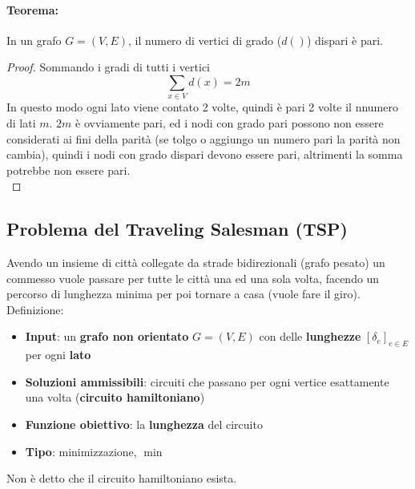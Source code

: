 \documentclass[11pt]{article}
\begin{document}
	\paragraph{Teorema:} In un grafo $G=(V,E)$, il numero di vertici di grado ($d()$) dispari è pari.\\
	
	\begin{proof}
		Sommando i gradi di tutti i vertici
		$$ \sum_{x \in V} d(x) = 2m $$
		In questo modo ogni lato viene contato 2 volte, quindi è pari 2 volte il nnumero di lati $m$. $2m$ è ovviamente pari, ed i nodi con grado pari possono non essere considerati ai fini della parità (se tolgo o aggiungo un numero pari la parità non cambia), quindi i nodi con grado dispari devono essere pari, altrimenti la somma potrebbe non essere pari.\\
	\end{proof}
	
	
	\newpage
	
	\subsection{Problema del Traveling Salesman (TSP)}
	Avendo un insieme di città collegate da strade bidirezionali (grafo pesato) un commesso vuole passare per tutte le città una ed una sola volta, facendo un percorso di lunghezza minima per poi tornare a casa (vuole fare il giro).\\
	
	Definizione: 
	\begin{itemize}
		\item \textbf{Input}: un \textbf{grafo non orientato} $G = (V,E)$ con delle \textbf{lunghezze} $[\delta_e]_{e \in E}$ per ogni \textbf{lato}
		
		\item \textbf{Soluzioni ammissibili}: circuiti che passano per ogni vertice esattamente una volta (\textbf{circuito hamiltoniano})
		
		\item \textbf{Funzione obiettivo}: la \textbf{lunghezza} del circuito
		
		\item \textbf{Tipo}: minimizzazione, $\min$
	\end{itemize}
	
	
	Non è detto che il circuito hamiltoniano esista.\\
	
\end{document}
